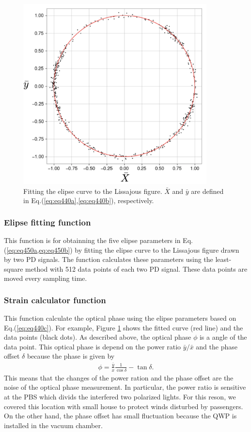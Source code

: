 \begin{figure}[h]
  \centering
  \includegraphics[width=10cm]{./img_chap4/img440.png}
  \caption{Fitting the elipse curve to the Lissajous figure. $\bar{X}$ and $\bar{y}$ are defined in Eq.(\ref{eq:eq440a},\ref{eq:eq440b}), respectively. } \label{img:img440}
\end{figure}

\subsubsection{Elipse fitting function}
This function is for obtainning the five elipse parameters in Eq.(\ref{eq:eq450a,eq:eq450b}) by fitting the elipse curve to the Lissajous figure drawn by two PD signals. The function calculates these parameters using the least-square method with 512 data points of each two PD signal. These data points are moved every sampling time.

\subsubsection{Strain calculator function}
This function calculate the optical phase using the elipse parameters based on Eq.(\ref{eq:eq440c}). For example, Figure  \ref{img:img440} shows the fitted curve (red line) and the data points (black dots). As described above, the optical phase $\phi$ is a angle of the data point. This optical phase is depend on the power ratio $\bar{y}/\bar{x}$ and the phase offset $\delta$ because the phase is given by
\begin{eqnarray}
  \phi = \frac{\bar{y}}{x}\frac{1}{\cos{\delta}} - \tan{\delta}.
\end{eqnarray}
This means that the changes of the power ration and the phase offset are the noise of the optical phase measurement. In particular, the power ratio is sensitive at the PBS which divids the interfered two polarized lights. For this reson,  we covered this location with small house to protect winds disturbed by passengers. On the other hand, the phase offset has small fluctuation because the QWP is installed in the vacuum chamber.

